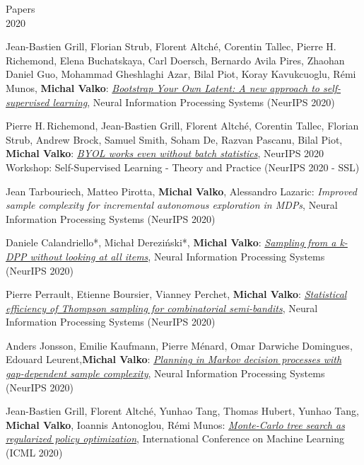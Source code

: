 \documentclass{resume}
\begin{document}
\begin{category}{Papers\\2020}

\citembullet
Jean-Bastien Grill, Florian Strub, Florent Altch\' e, Corentin Tallec, Pierre H. Richemond, Elena Buchatskaya, Carl Doersch, Bernardo Avila Pires, Zhaohan Daniel Guo, Mohammad Gheshlaghi Azar, Bilal Piot, Koray Kavukcuoglu, R\' emi Munos, {\bf Michal Valko}:
\href{http://researchers.lille.inria.fr/~valko/hp/serve.php?what=publications/grill2020bootstrap}{\emph{Bootstrap Your Own Latent: A new approach to self-supervised learning}},
Neural Information Processing Systems
({\sf NeurIPS 2020}) 

\citembullet
Pierre H.\,Richemond, Jean-Bastien Grill, Florent Altch\' e, Corentin Tallec, Florian Strub,  Andrew Brock, Samuel Smith, Soham De, Razvan Pascanu, Bilal Piot, {\bf Michal Valko}:
\href{https://arxiv.org/pdf/2010.10241.pdf}{\emph{BYOL works even without batch statistics}},
NeurIPS 2020 Workshop: Self-Supervised Learning - Theory and Practice
({\sf NeurIPS 2020 - SSL}) 


\citembullet
Jean Tarbouriech, Matteo Pirotta, {\bf Michal Valko}, Alessandro Lazaric:
{\emph{Improved sample complexity for incremental autonomous exploration in MDPs}},
Neural Information Processing Systems
({\sf NeurIPS 2020}) 

\citembullet
Daniele Calandriello*, Micha\l{} Derezi\'nski*, {\bf Michal Valko}:
\href{http://arxiv.org/abs/2006.16947}{\emph{Sampling from a k-DPP without looking at all items}},
Neural Information Processing Systems
({\sf NeurIPS 2020}) 

\citembullet
Pierre Perrault, Etienne Boursier, Vianney Perchet, {\bf Michal Valko}:
\href{http://arxiv.org/abs/2006.06613}{\emph{Statistical efficiency of Thompson sampling for combinatorial semi-bandits}},
Neural Information Processing Systems
({\sf NeurIPS 2020}) 

\citembullet
Anders Jonsson, Emilie Kaufmann, Pierre M\' enard, Omar Darwiche Domingues, Edouard Leurent,{\bf Michal Valko}:
\href{https://arxiv.org/abs/2006.05879}{\emph{Planning in Markov decision processes with gap-dependent sample complexity}},
Neural Information Processing Systems
({\sf NeurIPS 2020}) 


\citembullet
Jean-Bastien Grill, Florent Altché, Yunhao Tang, Thomas Hubert, Yunhao Tang, {\bf Michal Valko}, Ioannis Antonoglou, R\' emi Munos:
\href{https://arxiv.org/pdf/2007.12509.pdff}
{\emph{Monte-Carlo tree search as regularized policy optimization}},
International Conference on Machine Learning
({\sf ICML 2020}) 


\end{category}
\end{document}
